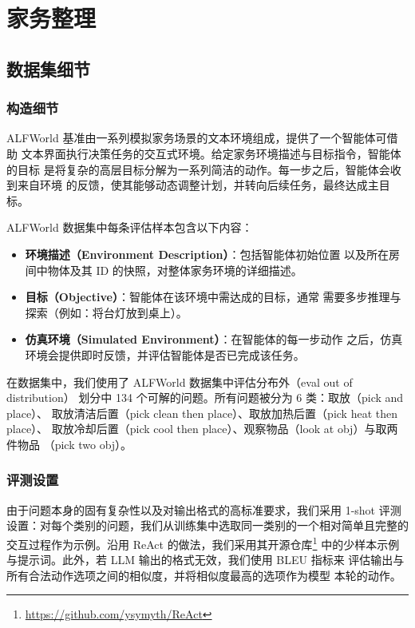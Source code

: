 
\section{家务整理}\label{app:hh}

\subsection{数据集细节}

\subsubsection*{构造细节}

ALFWorld 基准由一系列模拟家务场景的文本环境组成，提供了一个智能体可借助
文本界面执行决策任务的交互式环境。给定家务环境描述与目标指令，智能体的目标
是将复杂的高层目标分解为一系列简洁的动作。每一步之后，智能体会收到来自环境
的反馈，使其能够动态调整计划，并转向后续任务，最终达成主目标。

ALFWorld 数据集中每条评估样本包含以下内容：
\begin{itemize}
    \item \textbf{环境描述（Environment Description）}：包括智能体初始位置
          以及所在房间中物体及其 ID 的快照，对整体家务环境的详细描述。
    \item \textbf{目标（Objective）}：智能体在该环境中需达成的目标，通常
          需要多步推理与探索（例如：将台灯放到桌上）。
    \item \textbf{仿真环境（Simulated Environment）}：在智能体的每一步动作
          之后，仿真环境会提供即时反馈，并评估智能体是否已完成该任务。
\end{itemize}

在数据集中，我们使用了 ALFWorld 数据集中评估分布外（eval out of distribution）
划分中 134 个可解的问题。所有问题被分为 6 类：取放（pick and place）、
取放清洁后置（pick clean then place）、取放加热后置（pick heat then place）、
取放冷却后置（pick cool then place）、观察物品（look at obj）与取两件物品
（pick two obj）。

\subsubsection*{评测设置}

由于问题本身的固有复杂性以及对输出格式的高标准要求，我们采用 1-shot 评测
设置：对每个类别的问题，我们从训练集中选取同一类别的一个相对简单且完整的
交互过程作为示例。沿用 ReAct \citep{yao2023breact} 的做法，我们采用其开源仓库\footnote{\url{https://github.com/ysymyth/ReAct}}
中的少样本示例与提示词。此外，若 LLM 输出的格式无效，我们使用 BLEU 指标来
评估输出与所有合法动作选项之间的相似度，并将相似度最高的选项作为模型
本轮的动作。

